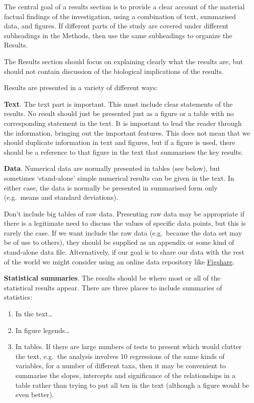 \documentclass[
]{book}
\begin{document}
The central goal of a results section is to provide a clear account of the material factual findings of the investigation, using a combination of text, summarised data, and figures. If different parts of the study are covered under different subheadings in the Methods, then use the same subheadings to organize the Results.

The Results section should focus on explaining clearly what the results are, but should not contain discussion of the biological implications of the results.

Results are presented in a variety of different ways:

\textbf{Text}. The text part is important. This must include clear statements of the results. No result should just be presented just as a figure or a table with no corresponding statement in the text. It is important to lead the reader through the information, bringing out the important features. This does not mean that we should duplicate information in text and figures, but if a figure is used, there should be a reference to that figure in the text that summarises the key results.

\textbf{Data}. Numerical data are normally presented in tables (see below), but sometimes `stand-alone' simple numerical results can be given in the text. In either case, the data is normally be presented in summarised form only (e.g.~means and standard deviations).

Don't include big tables of raw data. Presenting raw data may be appropriate if there is a legitimate need to discuss the values of specific data points, but this is rarely the case. If we want include the raw data (e.g.~because the data set may be of use to others), they should be supplied as an appendix or some kind of stand-alone data file. Alternatively, if our goal is to share our data with the rest of the world we might consider using an online data repository like \href{http://figshare.com}{Figshare}.

\textbf{Statistical summaries}. The results should be where most or all of the statistical results appear. There are three places to include summaries of statistics:

\begin{enumerate}
\def\labelenumi{\arabic{enumi}.}
\item
  In the text\ldots{}
\item
  In figure legends\ldots{}
\item
  In tables. If there are large numbers of tests to present which would clutter the text, e.g.~the analysis involves 10 regressions of the same kinds of variables, for a number of different taxa, then it may be convenient to summarise the slopes, intercepts and significance of the relationships in a table rather than trying to put all ten in the text (although a figure would be even better).
\end{enumerate}
\end{document}

